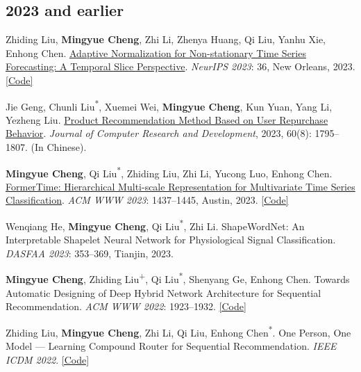\documentclass[UTF8,fontset=fandol,scheme=plain,11pt,a4paper]{ctexart}
\newcommand{\pubentry}[1]{\item \begin{minipage}[t]{\linewidth}#1\end{minipage}}
\begin{document}
\subsection{2023 and earlier}
\begin{publist}[start=54]
\pubentry{Zhiding Liu, \textbf{Mingyue Cheng}, Zhi Li, Zhenya Huang, Qi Liu, Yanhu Xie, Enhong Chen. \href{https://mingyue-cheng.github.io/files/papers/san-neurips2024.pdf}{Adaptive Normalization for Non-stationary Time Series Forecasting: A Temporal Slice Perspective}. \emph{NeurIPS 2023}: 36, New Orleans, 2023. \href{https://github.com/icantnamemyself/SAN}{[Code]}}

\pubentry{Jie Geng, Chunli Liu\textsuperscript{*}, Xuemei Wei, \textbf{Mingyue Cheng}, Kun Yuan, Yang Li, Yezheng Liu. \href{https://doi.org/10.7544/issn1000-1239.202330263}{Product Recommendation Method Based on User Repurchase Behavior}. \emph{Journal of Computer Research and Development}, 2023, 60(8): 1795--1807. (In Chinese).}

\pubentry{\textbf{Mingyue Cheng}, Qi Liu\textsuperscript{*}, Zhiding Liu, Zhi Li, Yucong Luo, Enhong Chen. \href{https://mingyue-cheng.github.io/files/papers/formertime-www2023.pdf}{FormerTime: Hierarchical Multi-scale Representation for Multivariate Time Series Classification}. \emph{ACM WWW 2023}: 1437--1445, Austin, 2023. \href{https://github.com/Mingyue-Cheng/FormerTime}{[Code]}}

\pubentry{Wenqiang He, \textbf{Mingyue Cheng}, Qi Liu\textsuperscript{*}, Zhi Li. ShapeWordNet: An Interpretable Shapelet Neural Network for Physiological Signal Classification. \emph{DASFAA 2023}: 353--369, Tianjin, 2023.}

\pubentry{\textbf{Mingyue Cheng}, Zhiding Liu\textsuperscript{+}, Qi Liu\textsuperscript{*}, Shenyang Ge, Enhong Chen. Towards Automatic Designing of Deep Hybrid Network Architecture for Sequential Recommendation. \emph{ACM WWW 2022}: 1923--1932. \href{https://github.com/Mingyue-Cheng/NASR}{[Code]}}

\pubentry{Zhiding Liu, \textbf{Mingyue Cheng}, Zhi Li, Qi Liu, Enhong Chen\textsuperscript{*}. One Person, One Model --- Learning Compound Router for Sequential Recommendation. \emph{IEEE ICDM 2022}. \href{https://github.com/Mingyue-Cheng/CANet}{[Code]}}


\end{publist}
\end{document}
